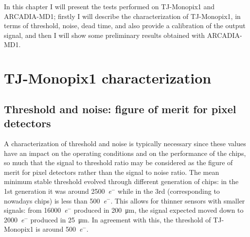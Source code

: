 In this chapter I will present the tests performed on TJ-Monopix1 and ARCADIA-MD1; firstly I will describe the characterization of TJ-Monopix1, in terms of threshold, noise, dead time, and also provide a calibration of the output signal, and then I will show some preliminary results obtained with ARCADIA-MD1.

\section{TJ-Monopix1 characterization}
    \subsection{Threshold and noise: figure of merit for pixel detectors}
        A characterization of threshold and noise is typically necessary since these values have an impact on the operating conditions and on the performance of the chips, so much that the signal to threshold ratio may be considered as the figure of merit for pixel detectors rather than the signal to noise ratio.
        The mean minimum stable threshold evolved through different generation of chips: in the 1st generation it was around \SI{2500}{\elementarycharge}$^-$ while in the 3rd (corresponding to nowadays chips) is less than \SI{500}{\elementarycharge}$^-$. This allows for thinner sensors with smaller signals: from \SI{16000}{\elementarycharge}$^-$ produced in \SI{200}{\um}, the signal expected moved down to \SI{2000}{\elementarycharge}$^-$ produced in \SI{25}{\um}. In agreement with this, the threshold of TJ-Monopix1 is around \SI{500}{\elementarycharge}$^-$.
 
